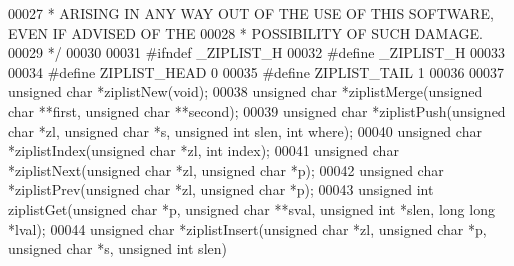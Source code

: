 \begin{DoxyCode}
00027 \textcolor{comment}{ * ARISING IN ANY WAY OUT OF THE USE OF THIS SOFTWARE, EVEN IF ADVISED OF THE}
00028 \textcolor{comment}{ * POSSIBILITY OF SUCH DAMAGE.}
00029 \textcolor{comment}{ */}
00030 
00031 \textcolor{preprocessor}{#}\textcolor{preprocessor}{ifndef} \textcolor{preprocessor}{\_ZIPLIST\_H}
00032 \textcolor{preprocessor}{#}\textcolor{preprocessor}{define} \textcolor{preprocessor}{\_ZIPLIST\_H}
00033 
00034 \textcolor{preprocessor}{#}\textcolor{preprocessor}{define} \textcolor{preprocessor}{ZIPLIST\_HEAD} 0
00035 \textcolor{preprocessor}{#}\textcolor{preprocessor}{define} \textcolor{preprocessor}{ZIPLIST\_TAIL} 1
00036 
00037 \textcolor{keywordtype}{unsigned} \textcolor{keywordtype}{char} *ziplistNew(\textcolor{keywordtype}{void});
00038 \textcolor{keywordtype}{unsigned} \textcolor{keywordtype}{char} *ziplistMerge(\textcolor{keywordtype}{unsigned} \textcolor{keywordtype}{char} **first, \textcolor{keywordtype}{unsigned} \textcolor{keywordtype}{char} **second);
00039 \textcolor{keywordtype}{unsigned} \textcolor{keywordtype}{char} *ziplistPush(\textcolor{keywordtype}{unsigned} \textcolor{keywordtype}{char} *zl, \textcolor{keywordtype}{unsigned} \textcolor{keywordtype}{char} *s, \textcolor{keywordtype}{unsigned} \textcolor{keywordtype}{int} slen, \textcolor{keywordtype}{int} where);
00040 \textcolor{keywordtype}{unsigned} \textcolor{keywordtype}{char} *ziplistIndex(\textcolor{keywordtype}{unsigned} \textcolor{keywordtype}{char} *zl, \textcolor{keywordtype}{int} index);
00041 \textcolor{keywordtype}{unsigned} \textcolor{keywordtype}{char} *ziplistNext(\textcolor{keywordtype}{unsigned} \textcolor{keywordtype}{char} *zl, \textcolor{keywordtype}{unsigned} \textcolor{keywordtype}{char} *p);
00042 \textcolor{keywordtype}{unsigned} \textcolor{keywordtype}{char} *ziplistPrev(\textcolor{keywordtype}{unsigned} \textcolor{keywordtype}{char} *zl, \textcolor{keywordtype}{unsigned} \textcolor{keywordtype}{char} *p);
00043 \textcolor{keywordtype}{unsigned} \textcolor{keywordtype}{int} ziplistGet(\textcolor{keywordtype}{unsigned} \textcolor{keywordtype}{char} *p, \textcolor{keywordtype}{unsigned} \textcolor{keywordtype}{char} **sval, \textcolor{keywordtype}{unsigned} \textcolor{keywordtype}{int} *slen, \textcolor{keywordtype}{long} \textcolor{keywordtype}{long} *lval);
00044 \textcolor{keywordtype}{unsigned} \textcolor{keywordtype}{char} *ziplistInsert(\textcolor{keywordtype}{unsigned} \textcolor{keywordtype}{char} *zl, \textcolor{keywordtype}{unsigned} \textcolor{keywordtype}{char} *p, \textcolor{keywordtype}{unsigned} \textcolor{keywordtype}{char} *s, \textcolor{keywordtype}{unsigned} \textcolor{keywordtype}{int} slen)

\end{DoxyCode}
